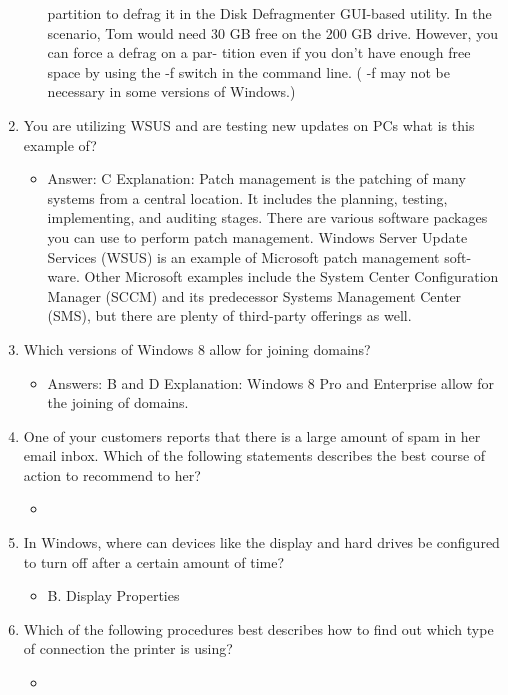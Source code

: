 \documentclass{article}
\begin{document}
\begin{enumerate}
\begin{itemize}
partition to defrag it in the Disk Defragmenter GUI-based utility. In the scenario, Tom
would need 30 GB free on the 200 GB drive. However, you can force a defrag on a par-
tition even if you don’t have enough free space by using the -f switch in the command
line. ( -f may not be necessary in some versions of Windows.)
    \end{itemize}
    \item You are utilizing WSUS and are testing new updates on PCs what is this example of? 
    \begin{itemize}
        \item Answer: C
Explanation: Patch management is the patching of many systems from a central
location. It includes the planning, testing, implementing, and auditing stages. There
are various software packages you can use to perform patch management. Windows
Server Update Services (WSUS) is an example of Microsoft patch management soft-
ware. Other Microsoft examples include the System Center Configuration Manager
(SCCM) and its predecessor Systems Management Center (SMS), but there are plenty
of third-party offerings as well.
    \end{itemize}
    \item Which versions of Windows 8 allow for joining domains? 
    \begin{itemize}
        \item Answers: B and D
Explanation: Windows 8 Pro and Enterprise allow for the joining of domains.
    \end{itemize}
    \item One of your customers reports that there is a large amount of
spam in her email inbox. Which of the following statements
describes the best course of action to recommend to her?
\begin{itemize}
        \item 
    \end{itemize}
    \item In Windows, where can devices like the display and hard drives be
configured to turn off after a certain amount of time?
    \begin{itemize}
        \item B. Display Properties
    \end{itemize}
    \item Which of the following procedures best describes how to find out
which type of connection the printer is using?
    \begin{itemize}
        \item 

\end{itemize}
\end{enumerate}
\end{document}
